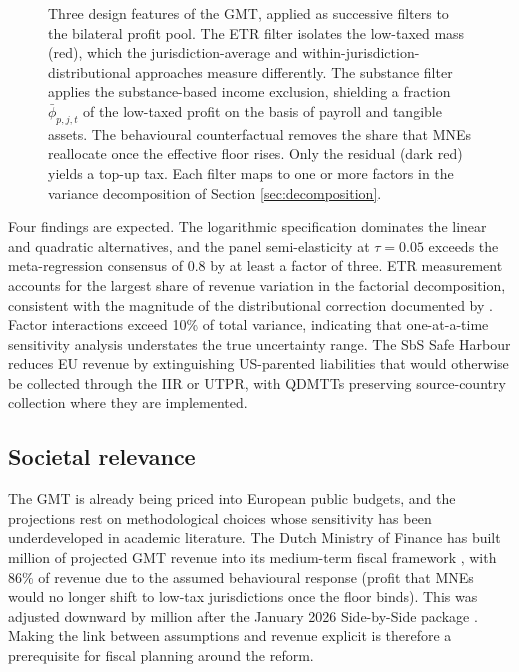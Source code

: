 \documentclass[11pt,a4paper]{article}
\newcommand{\EUR}{\texteuro}
\begin{document}
\begin{figure}[H]
\caption[GMT design features as successive filters.]{Three design features of the GMT, applied as successive filters to the bilateral profit pool. The ETR filter isolates the low-taxed mass (red), which the jurisdiction-average and within-jurisdiction-distributional approaches measure differently. The substance filter applies the substance-based income exclusion, shielding a fraction $\bar{\phi}_{p,j,t}$ of the low-taxed profit on the basis of payroll and tangible assets. The behavioural counterfactual removes the share that MNEs reallocate once the effective floor rises. Only the residual (dark red) yields a top-up tax. Each filter maps to one or more factors in the variance decomposition of Section \ref{sec:decomposition}.}
\label{fig:gmt_mechanics_intro}
\end{figure}

Four findings are expected. The logarithmic specification dominates the linear and quadratic alternatives, and the panel semi-elasticity at $\tau = 0.05$ exceeds the meta-regression consensus of 0.8 \citep{heckemeyer2017} by at least a factor of three. ETR measurement accounts for the largest share of revenue variation in the factorial decomposition, consistent with the magnitude of the distributional correction documented by \citet{hugger2026}. Factor interactions exceed 10\% of total variance, indicating that one-at-a-time sensitivity analysis understates the true uncertainty range. The SbS Safe Harbour reduces EU revenue by extinguishing US-parented liabilities that would otherwise be collected through the IIR or UTPR, with QDMTTs preserving source-country collection where they are implemented.


\subsection{Societal relevance}\label{sec:relevance}

The GMT is already being priced into European public budgets, and the projections rest on methodological choices whose sensitivity has been underdeveloped in academic literature. The Dutch Ministry of Finance has built \EUR466 million of projected GMT revenue into its medium-term fiscal framework \citep{36369_3}, with 86\% of revenue due to the assumed behavioural response (profit that MNEs would no longer shift to low-tax jurisdictions once the floor binds). This was adjusted downward by \EUR122 million after the January 2026 Side-by-Side package \citep{1028}. Making the link between assumptions and revenue explicit is therefore a prerequisite for fiscal planning around the reform.
\end{document}
